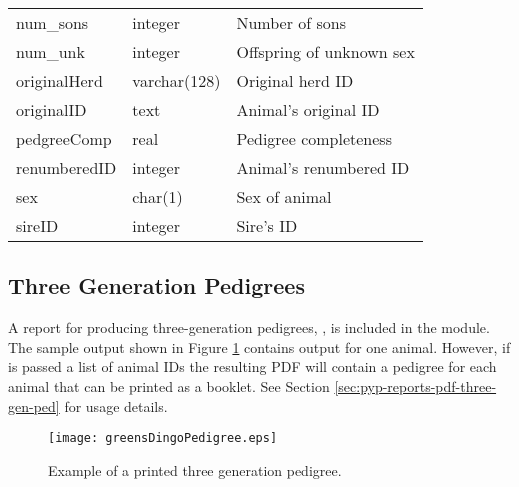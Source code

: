 \begin{center}
\begin{xtabular}{llp{2.5in}}
	num\_sons     &   integer       &  Number of sons \\
	num\_unk      &   integer       &  Offspring of unknown sex \\
	originalHerd  &   varchar(128)  &  Original herd ID \\
	originalID    &   text          &  Animal's original ID \\
	pedgreeComp   &   real          &  Pedigree completeness \\
	renumberedID  &   integer       &  Animal's renumbered ID \\
	sex           &   char(1)       &  Sex of animal \\
	sireID        &   integer       &  Sire's ID \\
    \end{xtabular}
\end{center}

\subsection{Three Generation Pedigrees}
\label{sec:reports-three-gen-peds}
A report for producing three-generation pedigrees, , is included in the  module. The sample output shown in Figure \ref{fig:reports-three-gen-ped} contains output for one animal. However, if  is passed a list of animal IDs the resulting PDF will contain a pedigree for each animal that can be printed as a booklet. See Section \ref{sec:pyp-reports-pdf-three-gen-ped} for usage details.
\begin{figure}
  \begin{center}
    \texttt{[image: greensDingoPedigree.eps]}
    \caption{Example of a printed three generation pedigree.}
    \label{fig:reports-three-gen-ped}
  \end{center}
\end{figure}

